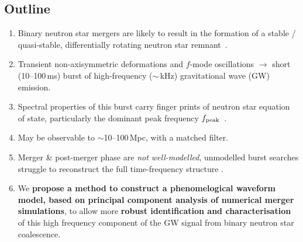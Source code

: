 \documentclass[a0,landscape]{a0poster}
\def\gw#1{gravitational wave#1 (GW#1)\gdef\gw{GW}}
\begin{document}
\begin{multicols}{4}



\color{DarkSlateGray} %

\section*{\centering Outline}

\begin{enumerate}
\item Binary neutron star mergers are likely to result in the formation of a
    stable / quasi-stable, differentially rotating neutron star
    remnant~\cite{shibata:06bns, giacomazzo:11, hotokezaka:11, bauswein:12}.
\item Transient non-axisymmetric deformations and $f$-mode oscillations
    $\rightarrow$ short (10--100\,ms) burst of high-frequency ($\sim $\,kHz)
    \gw{} emission.
\item Spectral properties of this burst carry finger prints of neutron star
    equation of state, particularly the dominant peak frequency $f_{\rm
    peak}$~\cite{hotokezaka:13,Bauswein38Eos}.
\item May be observable to $\sim$10--100\,Mpc, with a matched filter.
\item Merger \& post-merger phase are \emph{not well-modelled}, unmodelled burst
    searches struggle to reconstruct the full time-frequency structure .
\item We {\bf propose a method to construct a phenomelogical waveform model,
    based on principal component analysis of numerical merger simulations},
    to allow more {\bf robust identification and characterisation} of this
    high frequency component of the \gw{} signal from binary neutron star coalescence.
\end{enumerate}



\end{multicols}
\end{document}
